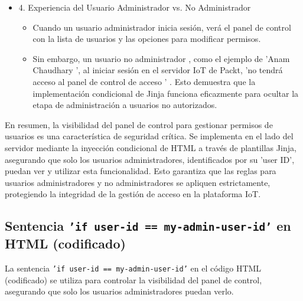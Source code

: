 \documentclass{report}
\begin{document}
\begin{itemize}
    \item 4. Experiencia del Usuario Administrador vs. No Administrador
    \begin{itemize}
        \item Cuando un  usuario administrador  inicia sesión, verá el panel de control con la lista de usuarios y las opciones para modificar permisos.
        \item Sin embargo, un  usuario no administrador , como el ejemplo de  'Anam Chaudhary ', al iniciar sesión en el servidor IoT de Packt, 
        'no tendrá acceso al panel de control de acceso ' . Esto demuestra que la implementación condicional de Jinja funciona eficazmente para 
        ocultar la etapa de administración a usuarios no autorizados.    
    \end{itemize}
\end{itemize}

En resumen, la visibilidad del panel de control para gestionar permisos de usuarios es una característica de seguridad crítica. Se implementa en el lado 
del servidor mediante la inyección condicional de HTML a través de plantillas Jinja, asegurando que solo los usuarios administradores, identificados por 
su 'user ID', puedan ver y utilizar esta funcionalidad. Esto garantiza que las reglas para usuarios administradores y no administradores se apliquen 
estrictamente, protegiendo la integridad de la gestión de acceso en la plataforma IoT.

\subsection{Sentencia \texttt{'if user-id == my-admin-user-id'} en HTML (codificado)}

La sentencia \texttt{'if user-id == my-admin-user-id'} en el código HTML (codificado) se utiliza para controlar la visibilidad del panel de control, 
asegurando que solo los usuarios administradores puedan verlo.
\end{document}
